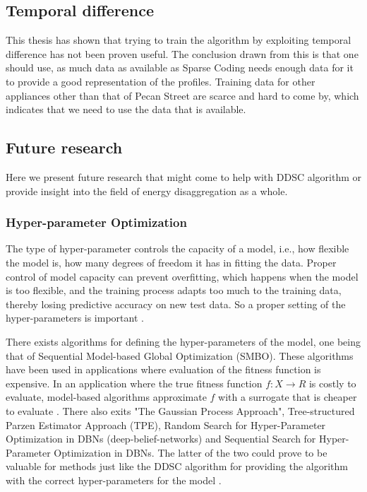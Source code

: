 \subsection{Temporal difference}
\label{sec:temp}
This thesis has shown that trying to train the algorithm by exploiting temporal difference has not been proven useful. The conclusion drawn from this is that one should use, as much data as available as Sparse Coding needs enough data for it to provide a good representation of the profiles. Training data for other appliances other than that of Pecan Street are scarce and hard to come by, which indicates that we need to use the data that is available.

\subsection{Future research}
\label{sec:future}
Here we present future research that might come to help with DDSC algorithm or provide insight into the field of energy disaggregation as a whole.
\subsubsection{Hyper-parameter Optimization}
\label{sec:params}

The type of hyper-parameter controls the capacity of a model, i.e., how flexible the model is, how many degrees of freedom it has in fitting the data. Proper control of model capacity can prevent overfitting, which happens when the model is too flexible, and the training process adapts too much to the training data, thereby losing predictive accuracy on new test data. So a proper setting of the hyper-parameters is important \cite{hyper}.

There exists algorithms for defining the hyper-parameters of the model, one being that of Sequential Model-based Global Optimization (SMBO). These algorithms have been used in applications where evaluation of the fitness function is expensive. In an application where the true fitness function $f : X \rightarrow R$ is costly to evaluate, model-based algorithms approximate $f$ with a surrogate
that is cheaper to evaluate \cite{hyper}. There also exits "The Gaussian Process Approach", Tree-structured Parzen Estimator Approach (TPE), Random Search for Hyper-Parameter Optimization in DBNs (deep-belief-networks) and Sequential Search for Hyper-Parameter Optimization in DBNs. The latter of the two could prove to be valuable for methods just like the DDSC algorithm for providing the algorithm with the correct hyper-parameters for the model \cite{hyper}.

